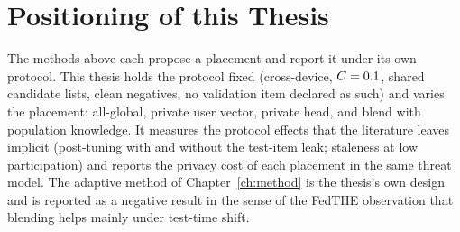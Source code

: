\section{Positioning of this Thesis}
\label{sec:lit-positioning}

The methods above each propose a placement and report it under its own protocol. This thesis
holds the protocol fixed (cross-device, $C=0.1$, shared candidate lists, clean
negatives, no validation item declared as such) and varies the placement: all-global, private
user vector, private head, and blend with population knowledge. It measures the protocol
effects that the literature leaves implicit (post-tuning with and without the test-item leak;
staleness at low participation) and reports the privacy cost of each placement in the same
threat model. The adaptive method of Chapter~\ref{ch:method} is the thesis's own design and is
reported as a negative result in the sense of the FedTHE observation that blending helps mainly
under test-time shift.

